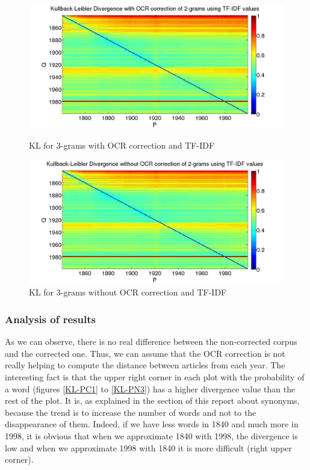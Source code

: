 \begin{figure}[H]
    \begin{minipage}[b]{0.48\linewidth}
        \includegraphics[scale=0.15]{Pictures/kullback-leibler/KL_2-grams_with_correction_tfidf.jpg}
        \caption{KL for 3-grams with OCR correction and TF-IDF}
        \label{KL-TC3}
    \end{minipage}\hfill
    \begin{minipage}[b]{0.5\linewidth}
        \includegraphics[scale=0.15]{Pictures/kullback-leibler/KL_2-grams_without_correction_tfidf.jpg}
        \caption{KL for 3-grams without OCR correction and TF-IDF}
        \label{KL-TN3}
    \end{minipage}\hfill
\end{figure}

\subsubsection{Analysis of results}
As we can observe, there is no real difference between the non-corrected corpus and the corrected one. Thus, we can assume that the OCR correction is not really helping to compute the distance between articles from each year. The interesting fact is that the upper right corner in each plot with the probability of a word (figures \ref{KL-PC1} to \ref{KL-PN3}) has a higher divergence value than the rest of the plot. It is, as explained in the section of this report about synonyms, because the trend is to increase the number of words and not to the disappearance of them. Indeed, if we have less words in 1840 and much more in 1998, it is obvious that when we approximate 1840 with 1998, the divergence is low and when we approximate 1998 with 1840 it is more difficult (right upper corner).

